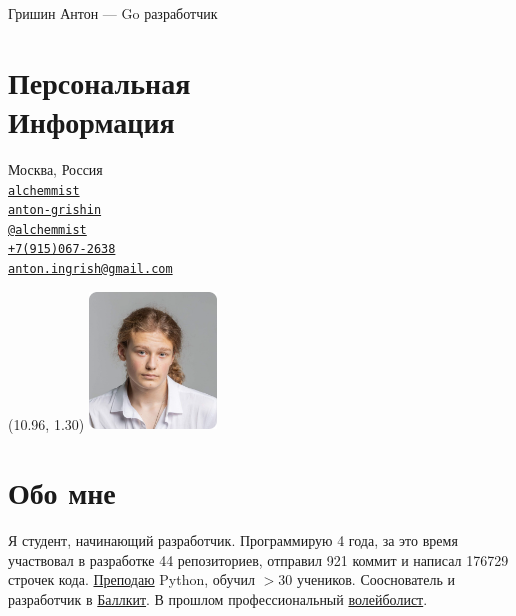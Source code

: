 \documentclass[margin,line]{resume}
\begin{document}
{\vspace*{-13mm}\sc \large Гришин Антон — Go разработчик} \\
\begin{resume}
  \begin{minipage}[t]{0.55\textwidth}
    \section{\mysidestyle Персональная\\Информация}
    Москва, Россия \\
    \faGithub  \space
    \href{https://github.com/alchemmist/}{\texttt{alchemmist}} \\
    \faLinkedin \space
    \href{https://www.linkedin.com/in/anton-grishin-6966a8362/}{\texttt{anton-grishin}}
    \\
    \faPaperPlane \space \href{https://t.me/alchemmist}{\texttt{@alchemmist}} \\
    \faPhone \space
    \href{tel:+1234567890}{\color{blue}\texttt{+7(915)067-2638}}  \\
    \faEnvelope \space
    \href{mailto:anton.ingrish@gmail.com}{\color{blue}\texttt{anton.ingrish@gmail.com}}
  \end{minipage}

  \begin{minipage}[H]{0.18\textwidth}
    \begin{textblock}{7}(10.96, 1.30)
      \includegraphics[width=0.255\textwidth]{../images/avatar.png}
    \end{textblock}
  \end{minipage}

  \vspace{-7mm}
  \section{\mysidestyle Обо мне}
  Я студент, начинающий разработчик. Программирую 4 года, за
  это время участвовал в разработке 44 репозиториев, отправил 921
  коммит и написал 176729 строчек кода.
  \href{https://www.avito.ru/moskva/predlozheniya_uslug/prepodavatel_programmirovaniya_na_python_2556461612}{Преподаю}
  Python, обучил $> 30$ учеников. Сооснователь и
  разработчик в \href{https://ballkit.ru/}{Баллкит}. В прошлом профессиональный
  \href{https://alchemmist.github.io/CV/attachments/sport.pdf}{волейболист}.


\end{resume}
\end{document}
